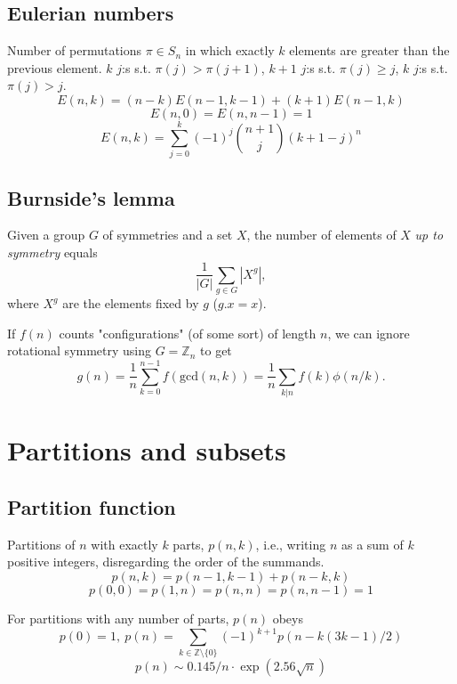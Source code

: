 {\subsection{Eulerian numbers}
	Number of permutations $\pi \in S_n$ in which exactly $k$ elements are greater than the previous element. $k$ $j$:s s.t. $\pi(j)>\pi(j+1)$, $k+1$ $j$:s s.t. $\pi(j)\geq j$, $k$ $j$:s s.t. $\pi(j)>j$.
	$$E(n,k) = (n-k)E(n-1,k-1) + (k+1)E(n-1,k)$$
	$$E(n,0) = E(n,n-1) = 1$$
	$$E(n,k) = \sum_{j=0}^k(-1)^j\binom{n+1}{j}(k+1-j)^n$$

\subsection{Burnside's lemma}
	Given a group $G$ of symmetries and a set $X$, the number of elements of $X$ \emph{up to symmetry} equals
	 $$ {\frac {1}{|G|}}\sum _{{g\in G}}|X^{g}|, $$
	 where $X^{g}$ are the elements fixed by $g$ ($g.x = x$).

	 If $f(n)$ counts "configurations" (of some sort) of length $n$, we can ignore rotational symmetry using $G = \mathbb Z_n$ to get
	 $$ g(n) = \frac 1 n \sum_{k=0}^{n-1}{f(\text{gcd}(n, k))} = \frac 1 n \sum_{k|n}{f(k)\phi(n/k)}. $$

\section{Partitions and subsets}
\subsection{Partition function}
	Partitions of $n$ with exactly $k$ parts, $p(n,k)$, i.e., writing $n$ as a sum of $k$ positive integers, disregarding the order of the summands.
	$$p(n,k) = p(n-1,k-1)+p(n-k,k)$$
	$$p(0,0)=p(1,n)=p(n,n)=p(n,n-1)=1$$

	For partitions with any number of parts, $p(n)$ obeys
	$$ p(0) = 1,\ p(n) = \sum_{k \in \mathbb Z \setminus \{0\}}{(-1)^{k+1} p(n - k(3k-1) / 2)} $$
	$$ p(n) \sim 0.145 / n \cdot \exp(2.56 \sqrt{n}) $$

%
%
}
